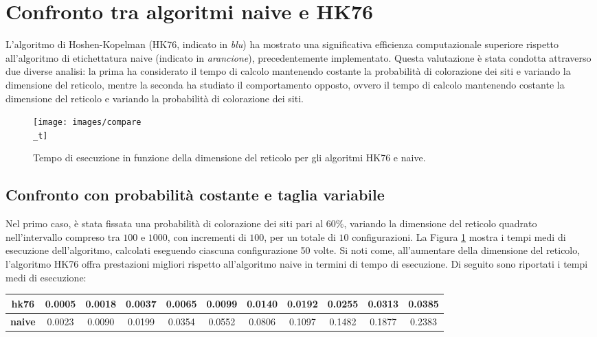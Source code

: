 \section{Confronto tra algoritmi naive e HK76}

L'algoritmo di Hoshen-Kopelman (HK76, indicato in \textit{blu}) ha mostrato una significativa efficienza computazionale superiore rispetto all'algoritmo di etichettatura naive (indicato in \textit{arancione}), precedentemente implementato. Questa valutazione è stata condotta attraverso due diverse analisi: la prima ha considerato il tempo di calcolo mantenendo costante la probabilità di colorazione dei siti e variando la dimensione del reticolo, mentre la seconda ha studiato il comportamento opposto, ovvero il tempo di calcolo mantenendo costante la dimensione del reticolo e variando la probabilità di colorazione dei siti.
\begin{figure}[H]
	\centering
	\texttt{[image: images/compare\\\_t]}
	\caption{Tempo di esecuzione in funzione della dimensione del reticolo per gli algoritmi HK76 e naive.}
	\label{fig:comparet}
\end{figure}
\subsection{Confronto con probabilità costante e taglia variabile}
Nel primo caso, è stata fissata una probabilità di colorazione dei siti pari al $60\%$, variando la dimensione del reticolo quadrato nell'intervallo compreso tra $100$ e $1000$, con incrementi di $100$, per un totale di $10$ configurazioni. La Figura \ref{fig:comparet} mostra i tempi medi di esecuzione dell'algoritmo, calcolati eseguendo ciascuna configurazione 50 volte. Si noti come, all’aumentare della dimensione del reticolo, l’algoritmo HK76 offra prestazioni migliori rispetto all’algoritmo naive in termini di tempo di esecuzione. Di seguito sono riportati i tempi medi di esecuzione:

\vspace{15px}
\noindent
\begin{tabular}{|c|*{10}{c|}}
	\hline
	\textbf{hk76} &0.0005 &	0.0018 &	0.0037 &	0.0065 &	0.0099 &	0.0140 &	0.0192 &	0.0255 &	0.0313 &	0.0385 \\
	\hline
	\textbf{naive} & 0.0023  &  0.0090  &  0.0199 &   0.0354 &   0.0552  &  0.0806 &   0.1097  &  0.1482 &   0.1877  &  0.2383\\
	\hline
\end{tabular}

